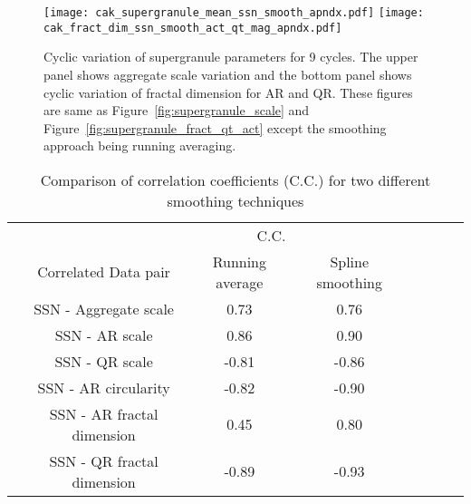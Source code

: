 \documentclass[manuscript]{aastex}	%
\begin{document}
\begin{figure*}[!htbp]
\centering
 \captionsetup[subfigure]{labelformat=empty}
  {\texttt{[image: cak\_supergranule\_mean\_ssn\_smooth\_apndx.pdf]}}
  {\texttt{[image: cak\_fract\_dim\_ssn\_smooth\_act\_qt\_mag\_apndx.pdf]}}
  \caption{Cyclic variation of supergranule parameters for 9 cycles. The upper panel shows aggregate scale variation and the bottom panel shows cyclic variation of fractal dimension for AR and QR. These figures are same as Figure~\ref{fig:supergranule_scale} and Figure~\ref{fig:supergranule_fract_qt_act} except the smoothing approach being running averaging.}
 \label{fig:fig_append}
\end{figure*}

 \begin{table}[!htbp]
\begin{center}
\centering
\caption{Comparison of correlation coefficients (C.C.)  for two different smoothing techniques}  

\label{table:correl}
\begin{tabular}{lcccc r@{   }l c} 

  \hline
     & \multicolumn{2}{r}{C.C.}\\
     & \multicolumn{1}{c}{Correlated Data pair}& \multicolumn{1}{c}{Running average} & \multicolumn{1}{c}{Spline smoothing} \\
      \hline
     &  SSN - Aggregate scale & 0.73 & 0.76 \\
     &  SSN - AR scale & 0.86 & 0.90 \\
     &  SSN - QR scale & -0.81 & -0.86 \\
     &  SSN - AR circularity & -0.82 & -0.90 \\
     &  SSN - AR fractal dimension & 0.45 & 0.80 \\
     &  SSN - QR fractal dimension & -0.89 & -0.93 \\
      \hline


\end{tabular}
\end{center}
\end{table}

 
\end{document}
